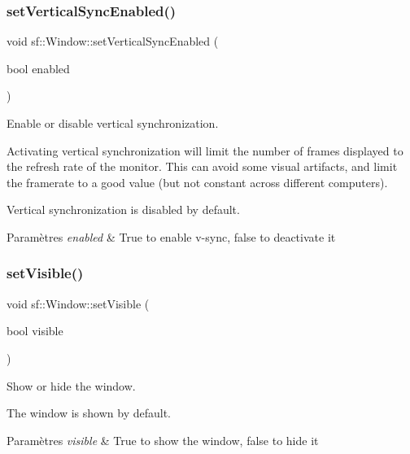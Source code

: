 \subsubsection{\texorpdfstring{set\+Vertical\+Sync\+Enabled()}{setVerticalSyncEnabled()}}
{\footnotesize\ttfamily void sf\+::\+Window\+::set\+Vertical\+Sync\+Enabled (\begin{DoxyParamCaption}\item[{bool}]{enabled }\end{DoxyParamCaption})}



Enable or disable vertical synchronization. 

Activating vertical synchronization will limit the number of frames displayed to the refresh rate of the monitor. This can avoid some visual artifacts, and limit the framerate to a good value (but not constant across different computers).

Vertical synchronization is disabled by default.


\begin{DoxyParams}{Paramètres}
{\em enabled} & True to enable v-\/sync, false to deactivate it \\
\hline
\end{DoxyParams}
\mbox{\label{classsf_1_1Window_a160f7f11a207603d7e99ce606e749703}} 
\subsubsection{\texorpdfstring{set\+Visible()}{setVisible()}}
{\footnotesize\ttfamily void sf\+::\+Window\+::set\+Visible (\begin{DoxyParamCaption}\item[{bool}]{visible }\end{DoxyParamCaption})}



Show or hide the window. 

The window is shown by default.


\begin{DoxyParams}{Paramètres}
{\em visible} & True to show the window, false to hide it \\
\hline
\end{DoxyParams}
\mbox{\label{classsf_1_1Window_aaf02ab64fbc1d374eef3696df54137bc}} 
